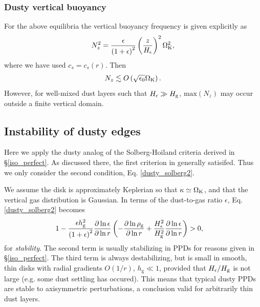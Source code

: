 \subsubsection{Dusty vertical buoyancy}\label{vbuoyancy}
For the above equilibria the vertical buoyancy frequency is given
explicitly as 
\begin{align}
  N_z^2 =
 \frac{\epsilon}{\left(1+\epsilon\right)^2}\left(\frac{z}{H_\epsilon}\right)^2\Omega_{\rm K}^2\notag,  
\end{align}
where we have used $c_s=c_s(r)$. Then 
\begin{align*}
N_z\lesssim
O\left(\sqrt{\epsilon_0}\Omega_{\rm K}\right). 
\end{align*}
However, for well-mixed dust layers such that $H_\epsilon \gg H_\mathrm{g}$, 
$\mathrm{max}\left(N_z\right)$ may occur outside a finite vertical domain.  

\subsection{Instability of dusty edges} 
Here we apply the dusty analog of the Solberg-Hoiland criteria derived
in \S\ref{iso_perfect}. As discussed there, the first criterion in
generally satisifed. Thus we only consider the second condition,
Eq. \ref{dusty_solberg2}. 

We assume the disk is approximately Keplerian so that
$\kappa\simeq\Omega_{\rm K}$, and that the vertical gas distribution is   
Gaussian. In terms of the dust-to-gas
ratio $\epsilon$, Eq. \ref{dusty_solberg2}
becomes 
\begin{align}
&1 - \frac{\epsilon
  h_\mathrm{g}^2}{\left(1+\epsilon\right)^2}
  \frac{\partial\ln{\epsilon}}{\partial\ln{r}}\left(-\frac{\partial\ln{\rho_\mathrm{g}}}{\partial\ln{r}}+\frac{H_\epsilon^2}{H_\mathrm{g}^2}\frac{\partial\ln{\epsilon}}{\partial\ln{r}}\right)
  > 0 \label{stability_est2},
\end{align}
for \emph{stability}. The second term is usually stabilizing in 
PPDs for reasons given in \S\ref{iso_perfect}. The third term is
always destabilizing, but is small in smooth, thin disks with radial
gradients $O(1/r)$, $h_\mathrm{g}\ll 1$, 
provided that $H_\epsilon/H_\mathrm{g}$ is not large (e.g. some dust settling
has occured). This means that typical dusty PPDs are stable to
axisymmetric perturbations, a conclusion valid for arbitrarily thin
dust layers. 

